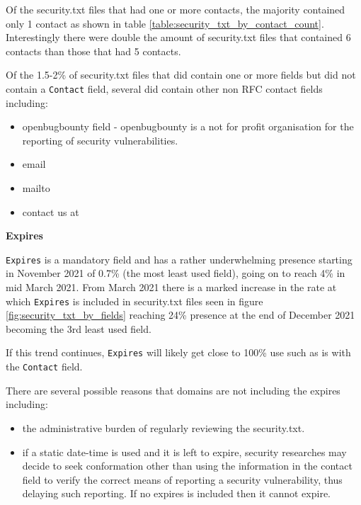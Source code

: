 \documentclass{mscreport}
\begin{document}
\noindent
Of the security.txt files that had one or more contacts, the majority contained only 1 contact as shown in table \ref{table:security_txt_by_contact_count}. Interestingly there were double the amount of security.txt files that contained 6 contacts than those that had 5 contacts.

\vspace{0.3cm} \noindent
Of the 1.5-2\% of security.txt files that did contain one or more fields but did not contain a \texttt{Contact} field, several did contain other non RFC contact fields including:

\begin{itemize}
	\setlength\itemsep{0.01em}
    \item openbugbounty field - openbugbounty is a not for profit organisation for the reporting of security vulnerabilities.
    \item email
    \item mailto
    \item contact us at
\end{itemize}

\vspace{0.7cm} \noindent
\textbf{Expires}

\noindent
\texttt{Expires} is a mandatory field and has a rather underwhelming presence starting in November 2021 of 0.7\% (the most least used field), going on to reach 4\% in mid March 2021. From March 2021 there is a marked increase in the rate at which \texttt{Expires} is included in security.txt files seen in figure \ref{fig:security_txt_by_fields} reaching 24\% presence at the end of December 2021 becoming the 3rd least used field.

\vspace{0.3cm} \noindent
If this trend continues, \texttt{Expires} will likely get close to 100\% use such as is with the \texttt{Contact} field.

\vspace{0.3cm} \noindent
There are several possible reasons that domains are not including the expires including:
\begin{itemize}
	\setlength\itemsep{0.01em}
    \item the administrative burden of regularly reviewing the security.txt.
    \item if a static date-time is used and it is left to expire, security researches may decide to seek conformation other than using the information in the contact field to verify the correct means of reporting a security vulnerability, thus delaying such reporting. If no expires is included then it cannot expire.
\end{itemize}
\end{document}
